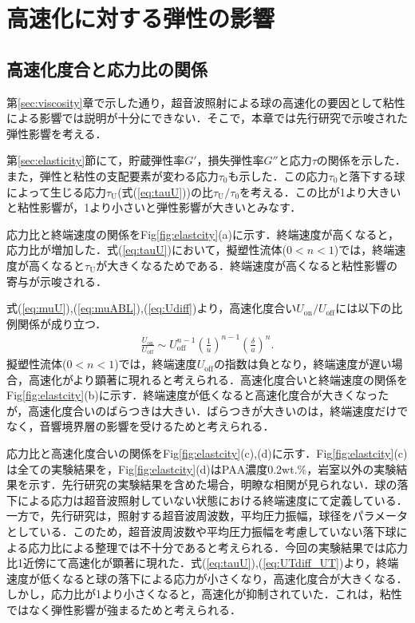 \section{高速化に対する弾性の影響}
\label{sec:elasticity-discussion}

\subsection{高速化度合と応力比の関係}
第\ref{sec:viscosity}章で示した通り，超音波照射による球の高速化の要因として粘性による影響では説明が十分にできない．そこで，本章では先行研究\cite{ref:8}で示唆された弾性影響を考える．

第\ref{sec:elasticity}節にて，貯蔵弾性率$G'$，損失弾性率$G''$と応力$\tau$の関係を示した．また，弾性と粘性の支配要素が変わる応力$\tau_\text{0}$も示した．この応力$\tau_\text{0}$と落下する球によって生じる応力$\tau_\text{U}$(式(\ref{eq:tauU}))の比$\tau_\text{U}/\tau_\text{0}$を考える．この比が1より大きいと粘性影響が，1より小さいと弾性影響が大きいとみなす．

応力比と終端速度の関係をFig\ref{fig:elastcity}(a)に示す．終端速度が高くなると，応力比が増加した．式(\ref{eq:tauU})において，擬塑性流体($0<n<1$)では，終端速度が高くなると$\tau_\text{U}$が大きくなるためである．終端速度が高くなると粘性影響の寄与が示唆される．

式(\ref{eq:muU}),(\ref{eq:muABL}),(\ref{eq:Udiff})より，高速化度合い$U_\text{on}/U_\text{off}$には以下の比例関係が成り立つ．
\begin{eqnarray}
    \frac{U_\text{on}}{U_\text{off}} \sim U_\text{off}^{n-1} \left(\frac{1}{u}\right)^{n-1} \left(\frac{\delta}{a}\right)^n .
    \label{eq:UTdiff_UT}
\end{eqnarray}
擬塑性流体($0<n<1$)では，終端速度$U_\text{off}$の指数は負となり，終端速度が遅い場合，高速化がより顕著に現れると考えられる．高速化度合いと終端速度の関係をFig\ref{fig:elastcity}(b)に示す．終端速度が低くなると高速化度合が大きくなったが，高速化度合いのばらつきは大きい．ばらつきが大きいのは，終端速度だけでなく，音響境界層の影響を受けるためと考えられる．

応力比と高速化度合いの関係をFig\ref{fig:elastcity}(c),(d)に示す．Fig\ref{fig:elastcity}(c)は全ての実験結果を，Fig\ref{fig:elastcity}(d)はPAA濃度0.2wt.\%，岩室\cite{ref:8}以外の実験結果を示す．先行研究\cite{ref:8}の実験結果を含めた場合，明瞭な相関が見られない．球の落下による応力は超音波照射していない状態における終端速度にて定義している．一方で，先行研究\cite{ref:8}は，照射する超音波周波数，平均圧力振幅，球径をパラメータとしている．このため，超音波周波数や平均圧力振幅を考慮していない落下球による応力比による整理では不十分であると考えられる．今回の実験結果では応力比1近傍にて高速化が顕著に現れた．式(\ref{eq:tauU}),(\ref{eq:UTdiff_UT})より，終端速度が低くなると球の落下による応力が小さくなり，高速化度合が大きくなる．しかし，応力比が1より小さくなると，高速化が抑制されていた．これは，粘性ではなく弾性影響が強まるためと考えられる．

